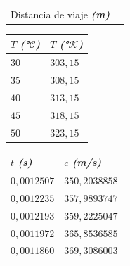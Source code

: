 \documentclass[twocolumn, 12pt]{article}
\newcommand{\bolditalic}[1]{\textbf{\textit{#1}}}
\begin{document}
\vspace{-1cm}

\noindent\makebox[\linewidth]{\rule{.9\linewidth}{0.4pt}}

\begin{table}[H]
    \begin{center}
        \begin{tabularx}{.9\linewidth}{|>{\centering\arraybackslash}X|>{\centering\arraybackslash}X|}
            \hline
            \multicolumn{2}{|c|}{Constantes}                               \\\hline
            Distancia de viaje \bolditalic{(m)} & \multirow{2}{*}{$0,438$} \\\hline
        \end{tabularx}
    \end{center}
\end{table}

\begin{table}[H]
    \begin{center}
        \begin{tabularx}{.9\linewidth}{|>{\centering\arraybackslash}X|>{\centering\arraybackslash}X|}
            \hline
            $T$ \bolditalic{(°$\mathcal{C}$)} & $T$ \bolditalic{(°$\mathcal{K}$)} \\\hline
            $30$                              & $303,15$                          \\\hline
            $35$                              & $308,15$                          \\\hline
            $40$                              & $313,15$                          \\\hline
            $45$                              & $318,15$                          \\\hline
            $50$                              & $323,15$                          \\\hline
        \end{tabularx}
    \end{center}
\end{table}

\begin{table}[H]
    \begin{center}
        \begin{tabularx}{.9\linewidth}{|>{\centering\arraybackslash}X|>{\centering\arraybackslash}X|}
            \hline
            $t$ \bolditalic{(s)} & $c$ \bolditalic{(m/s)} \\\hline
            $0,0012507$          & $350,2038858$          \\\hline
            $0,0012235$          & $357,9893747$          \\\hline
            $0,0012193$          & $359,2225047$          \\\hline
            $0,0011972$          & $365,8536585$          \\\hline
            $0,0011860$          & $369,3086003$          \\\hline
        \end{tabularx}
    \end{center}
\end{table}
\end{document}
